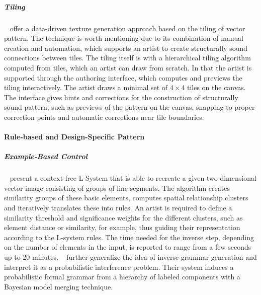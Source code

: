 \subparagraph{Tiling}
\label{subpara:analysis_regular_examplebased_control_tiling}

\citeauthor*{bian_2018_tpd}~\cite{bian_2018_tpd} offer a data-driven texture generation approach based on the tiling of vector pattern. The technique is worth mentioning due to its combination of manual creation and automation, which supports an artist to create structurally sound connections between tiles. The tiling itself is with a hierarchical tiling algorithm computed from tiles, which an artist can draw from scratch. In that the artist is supported through the authoring interface, which computes and previews the tiling interactively. The artist draws a minimal set of $4\times4$ tiles on the canvas. The interface gives hints and corrections for the construction of structurally sound pattern, such as previews of the pattern on the canvas, snapping to proper correction points and automatic corrections near tile boundaries.






\paragraph{Rule-based and Design-Specific Pattern}
\label{subsubsec:analysis_rulebased_and_designspecific}


\subparagraph{Example-Based Control}

\citeauthor*{stava_2010_ipm}~\cite{stava_2010_ipm} present a context-free L-System that is able to recreate a given two-dimensional vector image consisting of groups of line segments. The algorithm creates similarity groups of these basic elements, computes spatial relationship clusters and iteratively translates these into rules. An artist is required to define a similarity threshold and significance weights for the different clusters, such as element distance or similarity, for example, thus guiding their representation according to the L-system rules. The time needed for the inverse step, depending on the number of elements in the input, is reported to range from a few seconds up to 20 minutes. \citeauthor*{talton_2012_ldp}~\cite{talton_2012_ldp} further generalize the idea of inverse grammar generation and interpret it as a probabilistic interference problem. Their system induces a probabilistic formal grammar from a hierarchy of labeled components with a Bayesian model merging technique.

